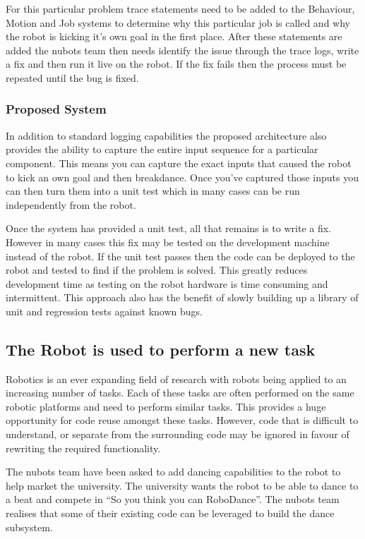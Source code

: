 \documentclass[english,12pt]{scrartcl}
\begin{document}
				For this particular problem trace statements need to be added to the Behaviour, Motion and Job systems to determine why this particular job is called and why the robot is kicking it's own goal in the first place.
				After these statements are added the \gls{nubots} team then needs identify the issue through the trace logs, write a fix and then run it live on the robot.
				If the fix fails then the process must be repeated until the bug is fixed.
				
			\subsubsection{Proposed System}
				In addition to standard logging capabilities the proposed architecture also provides the ability to capture the entire input sequence for a particular component.
				This means you can capture the exact inputs that caused the robot to kick an own goal and then breakdance.
				Once you've captured those inputs you can then turn them into a unit test which in many cases can be run independently from the robot.
				
				Once the system has provided a unit test, all that remains is to write a fix.
				However in many cases this fix may be tested on the development machine instead of the robot.
				If the unit test passes then the code can be deployed to the robot and tested to find if the problem is solved. This greatly reduces development time as testing on the robot hardware is time consuming and intermittent.
				This approach also has the benefit of slowly building up a library of unit and regression tests against known bugs.

		\subsection{The Robot is used to perform a new task}
			Robotics is an ever expanding field of research with robots being applied to an
			increasing number of tasks. Each of these tasks are often performed on the same robotic
			platforms and need to perform similar tasks. This provides a huge opportunity for code
			reuse amongst these tasks. However, code that is difficult to understand, or separate
			from the surrounding code may be ignored in favour of rewriting the required
			functionality.

			The \gls{nubots} team have been asked to add dancing capabilities to the robot to help market the 
			university. The university wants the robot to be able to dance to a beat and compete in 
			``So you think you can RoboDance''. The \gls{nubots} team realises that some of their existing
			code can be leveraged to build the dance subsystem.
\end{document}
